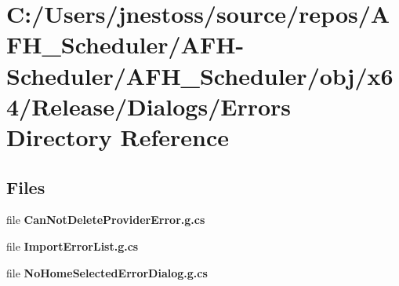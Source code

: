\section{C\+:/\+Users/jnestoss/source/repos/\+A\+F\+H\+\_\+\+Scheduler/\+A\+F\+H-\/\+Scheduler/\+A\+F\+H\+\_\+\+Scheduler/obj/x64/\+Release/\+Dialogs/\+Errors Directory Reference}
\label{dir_3de9700f17ac7dea6682b6ca30344946}
\subsection*{Files}
\begin{DoxyCompactItemize}
\item 
file \textbf{ Can\+Not\+Delete\+Provider\+Error.\+g.\+cs}
\item 
file \textbf{ Import\+Error\+List.\+g.\+cs}
\item 
file \textbf{ No\+Home\+Selected\+Error\+Dialog.\+g.\+cs}
\end{DoxyCompactItemize}
